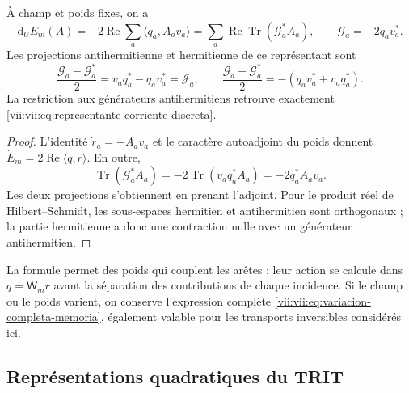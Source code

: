 \begin{proposition}
\label{vii:vii:prop:diferencial-invertible}
À champ et poids fixes, on a
\begin{equation}
 \mathrm d_UE_m(A)=-2\operatorname{Re}\sum_a
       \langle q_a,A_av_a\rangle
 =\sum_a\operatorname{Re}\operatorname{Tr}(\mathcal G_a^*A_a),
 \qquad \mathcal G_a=-2q_av_a^*.
 \label{vii:vii:eq:gradiente-transporte-completo}
\end{equation}
Les projections antihermitienne et hermitienne de ce représentant sont
\begin{equation}
 \frac{\mathcal G_a-\mathcal G_a^*}{2}
   =v_aq_a^*-q_av_a^*=\mathcal J_a,
 \qquad
 \frac{\mathcal G_a+\mathcal G_a^*}{2}
   =-(q_av_a^*+v_aq_a^*).
 \label{vii:vii:eq:proyecciones-gradiente-memoria}
\end{equation}
La restriction aux générateurs antihermitiens retrouve exactement
\eqref{vii:vii:eq:representante-corriente-discreta}.
\end{proposition}

\begin{proof}
L'identité \(\dot r_a=-A_av_a\) et le caractère autoadjoint du poids donnent \(\dot E_m=2\operatorname{Re}\langle q,\dot r\rangle\). En outre,
\[
 \operatorname{Tr}(\mathcal G_a^*A_a)
 =-2\operatorname{Tr}(v_aq_a^*A_a)=-2q_a^*A_av_a.
\]
Les deux projections s'obtiennent en prenant l'adjoint. Pour le produit
réel de Hilbert--Schmidt, les sous-espaces hermitien et antihermitien sont
orthogonaux ; la partie hermitienne a donc une contraction nulle avec
un générateur antihermitien.
\end{proof}

La formule permet des poids qui couplent les arêtes : leur action se calcule dans
\(q=\mathsf W_mr\) avant la séparation des contributions de chaque
incidence. Si le champ ou le poids varient, on conserve l'expression complète
\eqref{vii:vii:eq:variacion-completa-memoria}, également valable pour les
transports inversibles considérés ici.

\subsection{Représentations quadratiques du TRIT}

